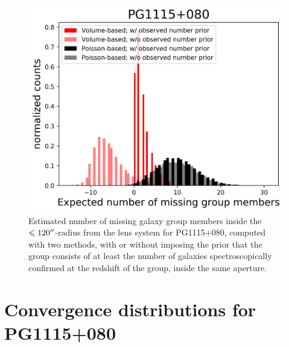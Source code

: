 \documentclass[useAMS,usenatbib]{mnras}
\begin{document}
\begin{figure}
\includegraphics[width=\linewidth]{estimatinggroupmembersPG1115.png}
\caption{Estimated number of missing galaxy group members inside the $\leqslant120\hbox{$^{\prime\prime}$}$-radius from the lens system for PG1115+080, computed with two methods, with or without imposing the prior that the group consists of at least the number of galaxies spectroscopically confirmed at the redshift of the group, inside the same aperture.}
\label{fig:missinggroupPG1115}
\end{figure}

\section{Convergence distributions for PG1115+080}
\label{convergence_PG1115}
\end{document}
